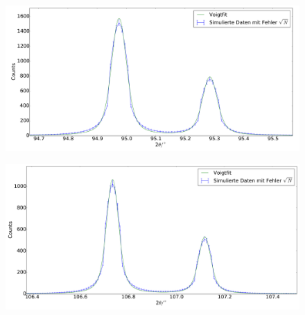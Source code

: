 \begin{figure}[H]
\begin{minipage}{.5\textwidth}
  \centering
  \includegraphics[scale=0.15]{Simulation_Siliciumpulver_7}
  \label{fig:pul_sim_sil_7}
\end{minipage}
\hspace{0.5cm}
\begin{minipage}{.5\textwidth}
  \centering
  \includegraphics[scale=0.15]{Simulation_Siliciumpulver_8}
  \label{fig:pul_sim_sil_8}
\end{minipage}
\end{figure}
